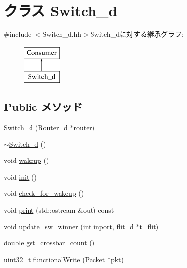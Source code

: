 \hypertarget{classSwitch__d}{
\section{クラス Switch\_\-d}
\label{classSwitch__d}
}


{\ttfamily \#include $<$Switch\_\-d.hh$>$}Switch\_\-dに対する継承グラフ:\begin{figure}[H]
\begin{center}
\leavevmode
\includegraphics[height=2cm]{classSwitch__d}
\end{center}
\end{figure}
\subsection*{Public メソッド}
\begin{DoxyCompactItemize}
\item 
\hyperlink{classSwitch__d_a0e97dda09012c1510a1ccc7ec35472f6}{Switch\_\-d} (\hyperlink{classRouter__d}{Router\_\-d} $\ast$router)
\item 
\hyperlink{classSwitch__d_a299b8d72ed88cc460722fe8c461446cd}{$\sim$Switch\_\-d} ()
\item 
void \hyperlink{classSwitch__d_ae674290a26ecbd622c5160e38e8a4fe9}{wakeup} ()
\item 
void \hyperlink{classSwitch__d_a02fd73d861ef2e4aabb38c0c9ff82947}{init} ()
\item 
void \hyperlink{classSwitch__d_a3312235aad1a35d2eb8dfe6b3a93d880}{check\_\-for\_\-wakeup} ()
\item 
void \hyperlink{classSwitch__d_ac55fe386a101fbae38c716067c9966a0}{print} (std::ostream \&out) const 
\item 
void \hyperlink{classSwitch__d_ad498c35c5be2d1b524846119d5e2b254}{update\_\-sw\_\-winner} (int inport, \hyperlink{classflit__d}{flit\_\-d} $\ast$t\_\-flit)
\item 
double \hyperlink{classSwitch__d_a7ef2e2d58897abf8e58f4bff4d3d01bc}{get\_\-crossbar\_\-count} ()
\item 
\hyperlink{Type_8hh_a435d1572bf3f880d55459d9805097f62}{uint32\_\-t} \hyperlink{classSwitch__d_ad07b9def1d6f5e5f988a254c3a9d1ad9}{functionalWrite} (\hyperlink{classPacket}{Packet} $\ast$pkt)
\end{DoxyCompactItemize}
